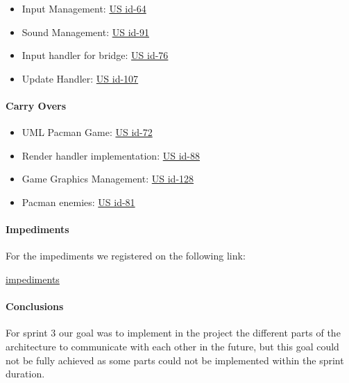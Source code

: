 \begin{itemize}
    \item Input Management: \href{https://tree.taiga.io/project/joseluis-teran-coffeetime/us/64?milestone=393697}{US id-64}
    \item Sound Management: \href{https://tree.taiga.io/project/joseluis-teran-coffeetime/us/91?milestone=393697}{US id-91}
    \item Input handler for bridge: \href{https://tree.taiga.io/project/joseluis-teran-coffeetime/us/76?milestone=393697}{US id-76}
    \item Update Handler: \href{https://tree.taiga.io/project/joseluis-teran-coffeetime/us/107?milestone=393697}{US id-107}
\end{itemize}

\paragraph{Carry Overs}
\begin{itemize}
    \item UML Pacman Game: \href{https://tree.taiga.io/project/joseluis-teran-coffeetime/us/72?milestone=395911}{US id-72}
    \item Render handler implementation: \href{https://tree.taiga.io/project/joseluis-teran-coffeetime/us/88?milestone=394885}{US id-88}
    \item Game Graphics Management: \href{https://tree.taiga.io/project/joseluis-teran-coffeetime/us/87?milestone=394885}{US id-128}
    \item Pacman enemies: \href{https://tree.taiga.io/project/joseluis-teran-coffeetime/us/81?milestone=394885}{US id-81}
\end{itemize}

\paragraph{Impediments}
For the impediments we registered on the following link:

\href{https://docs.google.com/spreadsheets/d/1hnMwOOVtyGWhViuAGwBsDpP79jTbHlJ09a_0gc9b4CM/edit?gid=1617748097#gid=1617748097}{impediments}

\paragraph{Conclusions}

For sprint 3 our goal was to implement in the project the different parts of the architecture to communicate with each other in the future, but this goal could not be fully achieved as some parts could not be implemented within the sprint duration.

